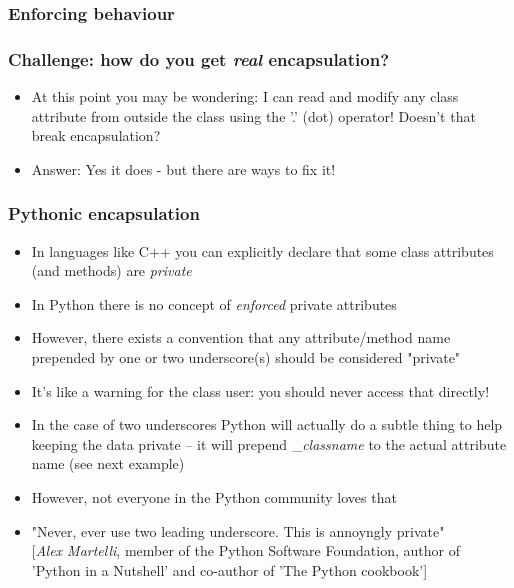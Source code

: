 \documentclass[9pt]{beamer}
\begin{document}
\begin{frame}
  \frametitle{Enforcing behaviour}
  
\end{frame}


\begin{frame}
  \frametitle{Challenge: how do you get \emph{real} encapsulation?}
  \begin{itemize}
    \item At this point you may be wondering: I can read and modify any class attribute 
          from outside the class using the '.' (dot) operator! 
          Doesn't that break encapsulation?
          
    \bigskip
    
    \item Answer: Yes it does - but there are ways to fix it!
  \end{itemize}
\end{frame}


\begin{frame}
  \frametitle{Pythonic encapsulation}
  
  \begin{itemize}
    \item In languages like C++ you can explicitly declare that some class
          attributes (and methods) are \emph{private}
    \smallskip
    \item In Python there is no concept of \emph{enforced} private attributes
    \smallskip
    \item However, there exists a convention that any attribute/method name prepended by one or two underscore(s) should be considered "private"
    \smallskip
    \item It's like a warning for the class user: you should never access that directly!
    \smallskip
    \item In the case of two underscores Python will actually do a subtle thing to help keeping the data private -- it will 
          prepend \_\emph{classname} to the actual attribute name (see next example)
    \smallskip
    \item However, not everyone in the Python community loves that
    \smallskip
    \item "Never, ever use two leading underscore. This is annoyngly private"\\
           \vspace{0.02\textheight}
           \footnotesize [\emph{Alex Martelli}, member of the Python Software Foundation, author of 'Python in a Nutshell' and co-author of 'The Python cookbook']
  \end{itemize}
  
\end{frame}
\end{document}
